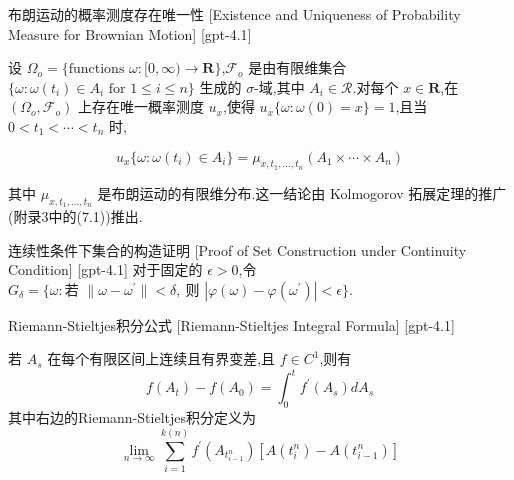 \documentclass[UTF8]{ctexart}
\begin{document}
    
    
    \begin{thm}
        {布朗运动的概率测度存在唯一性}
        [Existence and Uniqueness of Probability Measure for Brownian Motion]
        [gpt-4.1]
        
设 $\Omega_o = \{\text{functions } \omega : [0, \infty) \to \mathbf{R}\}$,$\mathcal{F}_o$ 是由有限维集合 $\{\omega : \omega(t_i) \in A_i \text{ for } 1 \leq i \leq n\}$ 生成的 $\sigma$-域,其中 $A_i \in \mathcal{R}$.对每个 $x \in \mathbf{R}$,在 $(\Omega_o, \mathcal{F}_o)$ 上存在唯一概率测度 $
u_x$,使得 $
u_x\{\omega : \omega(0) = x\} = 1$,且当 $0 < t_1 < \cdots < t_n$ 时,

\[
u_x\{\omega : \omega(t_i) \in A_i\} = \mu_{x, t_1, \ldots, t_n} (A_1 \times \cdots \times A_n)
\]

其中 $\mu_{x, t_1, \ldots, t_n}$ 是布朗运动的有限维分布.这一结论由 Kolmogorov 拓展定理的推广(附录3中的(7.1))推出.

    \end{thm}
    
    
    
    \begin{prf}
        {连续性条件下集合的构造证明}
        [Proof of Set Construction under Continuity Condition]
        [gpt-4.1]
        对于固定的 $\epsilon > 0$,令 $G_{ \delta } = \{ \omega : \text{若 } \| \omega - \omega^{\prime} \| < \delta,\ \text{则 } | \varphi(\omega) - \varphi(\omega^{\prime}) | < \epsilon \}$.
    \end{prf}
    
    
    
    \begin{thm}
        {Riemann-Stieltjes积分公式}
        [Riemann-Stieltjes Integral Formula]
        [gpt-4.1]
        
若 $A_{s}$ 在每个有限区间上连续且有界变差,且 $f \in C^{1}$,则有
\[
f( A_{t} ) - f( A_{0} ) = \int_{0}^{t} f^{\prime}( A_{s} ) d A_{s}
\]
其中右边的Riemann-Stieltjes积分定义为
\[
\lim_{n \to \infty} \sum_{i=1}^{k(n)} f^{\prime}( A_{t_{i-1}^{n}} ) [ A( t_{i}^{n} ) - A( t_{i-1}^{n} ) ]
\]

    \end{thm}
    
    
    
\end{document}
